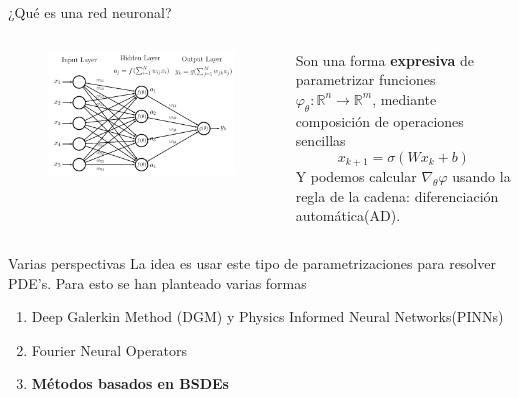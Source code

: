 \documentclass[aspectratio=169,xcolor=dvipsnames]{beamer}
\newcommand{\bbR}{\mathbb{R}}
\begin{document}
\begin{frame}{¿Qué es una red neuronal?}
    \begin{columns}[c] %
	
\begin{figure}
	\includegraphics[width=\linewidth]{images/neural_net.png}
\end{figure}
	
Son una forma \textbf{expresiva} de parametrizar funciones $\varphi_\theta:\bbR^n\to \bbR^m$, mediante composición de operaciones sencillas
\begin{equation*}
	x_{k+1}=\sigma(Wx_k+b)
\end{equation*}
Y podemos calcular $\nabla_\theta \varphi$ usando la regla de la cadena: diferenciación automática(AD).
\end{columns}
\end{frame}
\begin{frame}{Varias perspectivas}
	La idea es usar este tipo de parametrizaciones para resolver PDE's. Para esto se han planteado varias formas
	\begin{enumerate}
		\item Deep Galerkin Method (DGM) y Physics Informed Neural Networks(PINNs)
		\item Fourier Neural Operators
		\item \textbf{Métodos basados en BSDEs} 
	\end{enumerate}
\end{frame}

\end{document}
